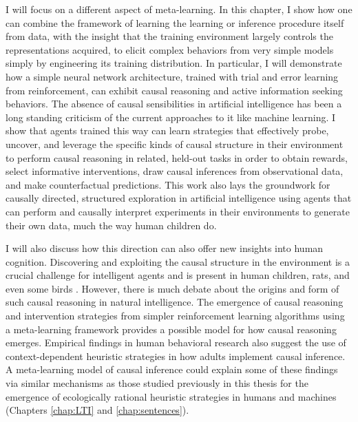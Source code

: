 I will focus on a different aspect of meta-learning. In this chapter, I show how one can combine the framework of learning the learning or inference procedure itself from data, with the insight that the training environment largely controls the representations acquired, to elicit complex behaviors from very simple models simply by engineering its training distribution. In particular, I will demonstrate how a simple neural network architecture, trained with trial and error learning from reinforcement, can exhibit causal reasoning and active information seeking behaviors. The absence of causal sensibilities in artificial intelligence has been a long standing criticism of the current approaches to it like machine learning. \citep{pearl88probabilistic, pearl2000} I show that agents trained this way can learn strategies that effectively probe, uncover, and leverage the specific kinds of causal structure in their environment to perform causal reasoning in related, held-out tasks in order to obtain rewards, select informative interventions, draw causal inferences from observational data, and make counterfactual predictions. This work also lays the groundwork for causally directed, structured exploration in artificial intelligence using agents that can perform and causally interpret experiments in their environments to generate their own data, much the way human children do\citep{gureckis2012self}.

I will also discuss how this direction can also offer new insights into human cognition. Discovering and exploiting the causal structure in the environment is a crucial challenge for intelligent agents and is present in human children, rats, and even some birds \citep{leslie1982perception,gopnik2001causal,gopnik2004theory,blaisdell2006causal, lagnado2013causal}. However, there is much debate about the origins and form of such causal reasoning in natural intelligence\citep{waldmann2013causal, cartwright2004causation}. The emergence of causal reasoning and intervention strategies from simpler reinforcement learning algorithms using a meta-learning framework provides a possible model for how causal reasoning emerges. Empirical findings in human behavioral research also suggest the use of context-dependent heuristic strategies in how adults implement causal inference. A meta-learning model of causal inference could explain some of these findings via similar mechanisms as those studied previously in this thesis for the emergence of ecologically rational heuristic strategies in humans and machines (Chapters \ref{chap:LTI} and \ref{chap:sentences}).

